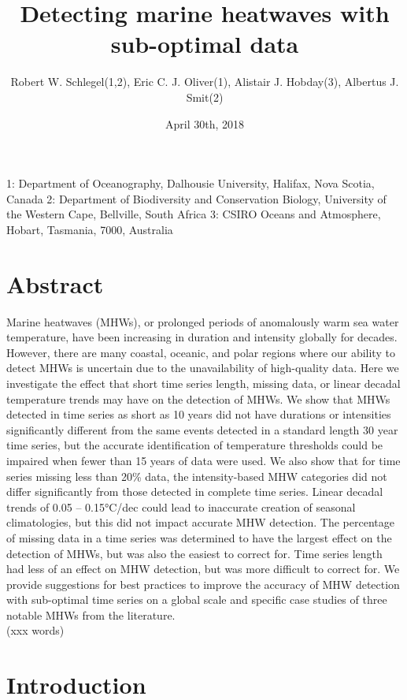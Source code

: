 \documentclass[]{article}
\title{Detecting marine heatwaves with sub-optimal data}
\author{Robert W. Schlegel(1,2), Eric C. J. Oliver(1), Alistair J. Hobday(3),
Albertus J. Smit(2)}
\date{April 30th, 2018}
\begin{document}
\maketitle

1: Department of Oceanography, Dalhousie University, Halifax, Nova
Scotia, Canada 2: Department of Biodiversity and Conservation Biology,
University of the Western Cape, Bellville, South Africa 3: CSIRO Oceans
and Atmosphere, Hobart, Tasmania, 7000, Australia

\hypertarget{abstract}{%
\section{Abstract}\label{abstract}}

Marine heatwaves (MHWs), or prolonged periods of anomalously warm sea
water temperature, have been increasing in duration and intensity
globally for decades. However, there are many coastal, oceanic, and
polar regions where our ability to detect MHWs is uncertain due to the
unavailability of high-quality data. Here we investigate the effect that
short time series length, missing data, or linear decadal temperature
trends may have on the detection of MHWs. We show that MHWs detected in
time series as short as 10 years did not have durations or intensities
significantly different from the same events detected in a standard
length 30 year time series, but the accurate identification of
temperature thresholds could be impaired when fewer than 15 years of
data were used. We also show that for time series missing less than 20\%
data, the intensity-based MHW categories did not differ significantly
from those detected in complete time series. Linear decadal trends of
0.05 -- 0.15°C/dec could lead to inaccurate creation of seasonal
climatologies, but this did not impact accurate MHW detection. The
percentage of missing data in a time series was determined to have the
largest effect on the detection of MHWs, but was also the easiest to
correct for. Time series length had less of an effect on MHW detection,
but was more difficult to correct for. We provide suggestions for best
practices to improve the accuracy of MHW detection with sub-optimal time
series on a global scale and specific case studies of three notable MHWs
from the literature.\\
(xxx words)

\hypertarget{introduction}{%
\section{Introduction}\label{introduction}}
\end{document}
